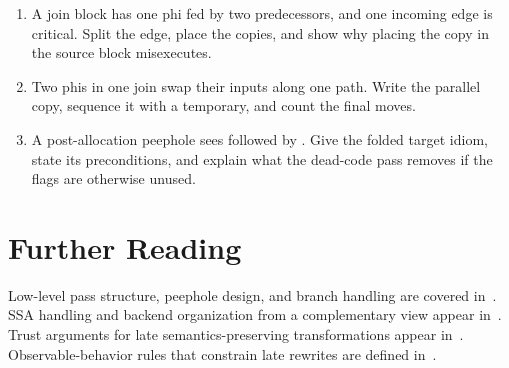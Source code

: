 \begin{enumerate}
\item A join block has one phi fed by two predecessors, and one incoming edge is critical. \label{ex:ch28-split-place} Split the edge, place the copies, and show why placing the copy in the source block misexecutes.
\item Two phis in one join swap their inputs along one path. \label{ex:ch28-swap-seq} Write the parallel copy, sequence it with a temporary, and count the final moves.
\item A post-allocation peephole sees  followed by . \label{ex:ch28-peephole} Give the folded target idiom, state its preconditions, and explain what the dead-code pass removes if the flags are otherwise unused.
\end{enumerate}

\section{Further Reading}\label{sec:ch28-reading}

Low-level pass structure, peephole design, and branch handling are covered in~\cite{morgan-1998-optimizing}.
SSA handling and backend organization from a complementary view appear in~\cite{appel-1998-modern}.
Trust arguments for late semantics-preserving transformations appear in~\cite{safonov-2010-trustworthy}.
Observable-behavior rules that constrain late rewrites are defined in~\cite{wg14-2011-c11}.
